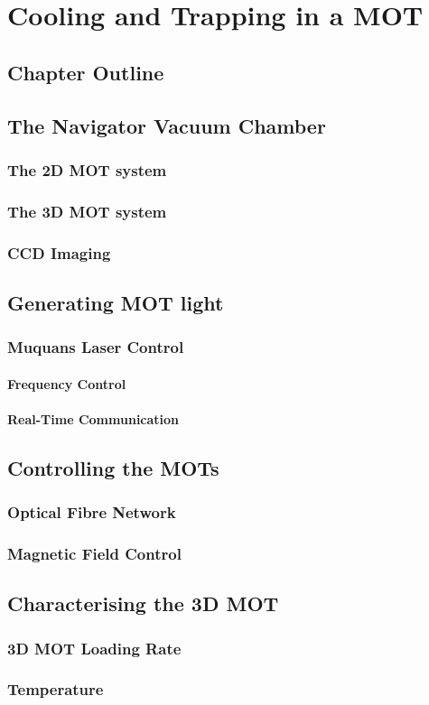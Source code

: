 \chapter{Cooling and Trapping in a MOT}
\section{Chapter Outline}

\section{The Navigator Vacuum Chamber}
\subsection{The 2D MOT system}
\subsection{The 3D MOT system}
\subsection{CCD Imaging}

\section{Generating MOT light}
\subsection{Muquans Laser Control}
\subsubsection{Frequency Control}
\subsubsection{Real-Time Communication} \label{subsec:muquans_comm}

\section{Controlling the MOTs}
\subsection{Optical Fibre Network}
\subsection{Magnetic Field Control}

\section{Characterising the 3D MOT}
\subsection{3D MOT Loading Rate}
\subsection{Temperature}

